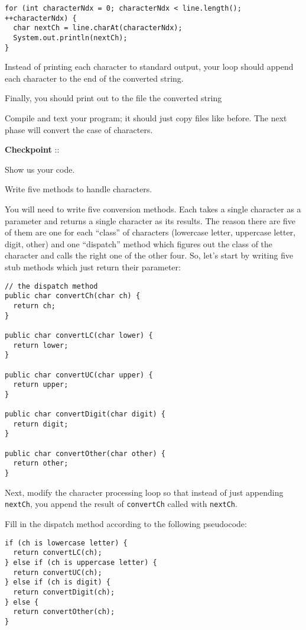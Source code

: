 \documentclass[12pt,oneside]{memoir}
\newcommand\code[1]{\lstinline^#1^}
\newcounter{LabPhase}
\newenvironment{LabExercises}{%
\renewcommand{\ExerciseListName}{Question}%
\renewcommand{\ExerciseListHeader}{\textbf{%
   Phase\ExerciseHeaderNB. }}
\begin{ExerciseList}}%
{\end{ExerciseList}}
\newcommand{\LabExercise}{\Exercise[name={Lab Phase\ExerciseHeaderNB},counter={LabPhase}]}
\newcounter{CheckPoint}
\newcommand{\Checkpoint}{\textbf{Checkpoint \theCheckPoint }:: \addtocounter{CheckPoint}{1}}
\begin{document}
\begin{LabExercises}
  \begin{lstlisting}
for (int characterNdx = 0; characterNdx < line.length(); ++characterNdx) {    
  char nextCh = line.charAt(characterNdx);
  System.out.println(nextCh);
}
  \end{lstlisting}

  Instead of printing each character to standard output, your loop
  should append each character to the end of the converted string.

  Finally, you should print out to the file the converted string
  
  Compile and text your program; it should just copy files like
  before. The next phase will convert the case of characters.

  \Checkpoint Show us your code.

  \LabExercise Write five methods to handle characters.

  You will need to write five conversion methods. Each takes a single
  character as a parameter and returns a single character as its
  results. The reason there are five of them are one for each
  ``class'' of characters (lowercase letter, uppercase letter, digit,
  other) and one ``dispatch'' method which figures out the class of
  the character and calls the right one of the other four. So, let's
  start by writing five stub methods which just return their
  parameter:

  \begin{lstlisting}
// the dispatch method
public char convertCh(char ch) {
  return ch;
}

public char convertLC(char lower) {
  return lower;
}

public char convertUC(char upper) {
  return upper;
}

public char convertDigit(char digit) {
  return digit;
}

public char convertOther(char other) {
  return other;
}
  \end{lstlisting}

  Next, modify the character processing loop so that instead of just
  appending \code{nextCh}, you append the result of \code{convertCh}
  called with \code{nextCh}.

  Fill in the dispatch method according to the following pseudocode:

  \begin{lstlisting}
if (ch is lowercase letter) {
  return convertLC(ch);
} else if (ch is uppercase letter) {
  return convertUC(ch);    
} else if (ch is digit) {
  return convertDigit(ch);    
} else {
  return convertOther(ch);    
}
  \end{lstlisting}


\end{LabExercises}
\end{document}
